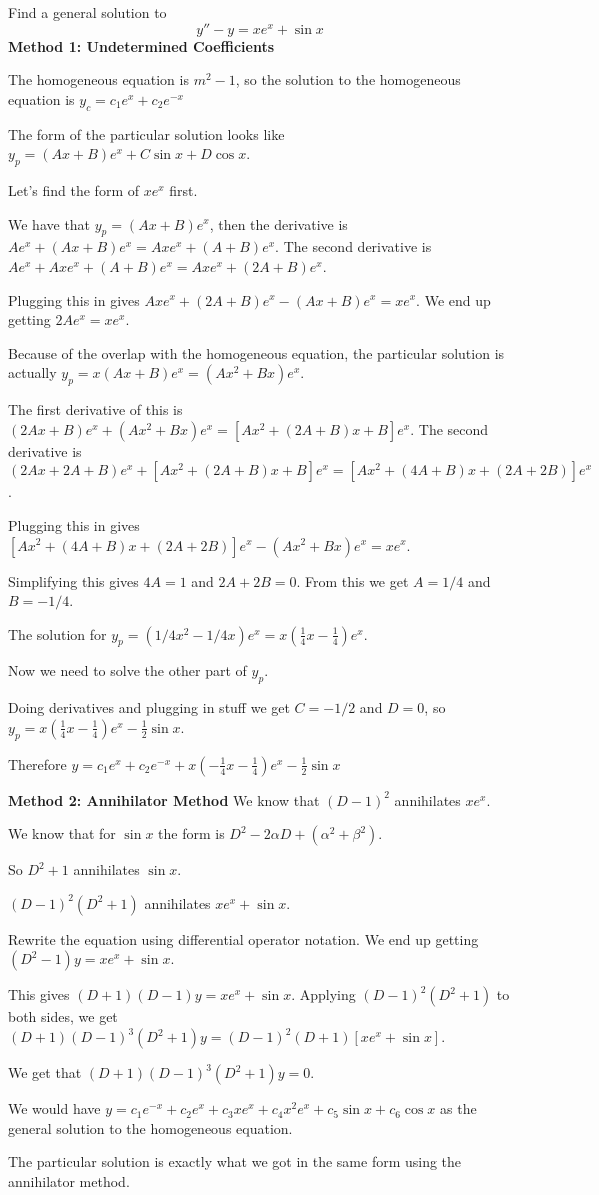 \documentclass[../diffeq.tex]{subfiles}
\begin{document}
\begin{example}
    Find a general solution to 
    \[ y''-y=xe^x+\sin x \]
    \textbf{Method 1: Undetermined Coefficients} 

    The homogeneous equation is $m^2-1$, so the solution to the homogeneous equation is $y_c=c_1e^x+c_2e^{-x}$

    The form of the particular solution looks like $y_p=(Ax+B)e^x + C\sin x + D\cos x$.

    Let's find the form of $xe^x$ first. 

    We have that $y_p=(Ax+B)e^x$, then the derivative is $Ae^x+(Ax+B)e^x=Axe^x+(A+B)e^x$. The second derivative is $Ae^x+Axe^x+(A+B)e^x= Axe^x+(2A+B)e^x$.

    Plugging this in gives $Axe^x+(2A+B)e^x-(Ax+B)e^x=xe^x$. We end up getting $2Ae^x=xe^x$.

    Because of the overlap with the homogeneous equation, the particular solution is actually $y_p=x(Ax+B)e^x=(Ax^2+Bx)e^x$.

    The first derivative of this is $(2Ax+B)e^x+(Ax^2+Bx)e^x = [Ax^2+(2A+B)x+B]e^x$. The second derivative is $(2Ax+2A+B)e^x+[Ax^2+(2A+B)x+B]e^x = [Ax^2+(4A+B)x+(2A+2B)]e^x$.

    Plugging this in gives $[Ax^2+(4A+B)x+(2A+2B)]e^x-(Ax^2+Bx)e^x=xe^x$.

    Simplifying this gives $4A=1$ and $2A+2B=0$. From this we get $A=1/4$ and $B=-1/4$.

    The solution for $y_p=(1/4 x^2-1/4x)e^x=x(\frac{1}{4}x-\frac{1}{4})e^x$.

    Now we need to solve the other part of $y_p$.

    Doing derivatives and plugging in stuff we get $C=-1/2$ and $D=0$, so $y_p=x(\frac{1}{4}x-\frac{1}{4})e^x-\frac{1}{2}\sin x$.

    Therefore $y = c_1e^x+c_2e^{-x}+x(-\frac{1}{4}x-\frac{1}{4})e^x-\frac{1}{2}\sin x$

    \textbf{Method 2: Annihilator Method}
    We know that $(D-1)^2$ annihilates $xe^x$.

    We know that for $\sin x$ the form is $D^2-2\alpha D+(\alpha^2+\beta^2)$.

    So $D^2+1$ annihilates $\sin x$.

    $(D-1)^2(D^2+1)$ annihilates $xe^x+\sin x$.

    Rewrite the equation using differential operator notation. We end up getting $(D^2-1)y=xe^x+\sin x$.

    This gives $(D+1)(D-1)y=xe^x+\sin x$. Applying $(D-1)^2(D^2+1)$ to both sides, we get $(D+1)(D-1)^3(D^2+1)y=(D-1)^2(D+1)[xe^x+\sin x]$.

    We get that $(D+1)(D-1)^3(D^2+1)y=0$.

    We would have $y=c_1e^{-x}+c_2e^x+c_3xe^x+c_4x^2e^x+c_5\sin x+c_6\cos x$ as the general solution to the homogeneous equation. 

    The particular solution is exactly what we got in the same form using the annihilator method.
\end{example}
\end{document}
